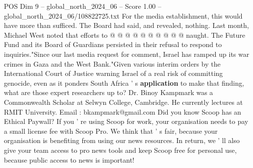 \begin{textsample}{POS Dim 9 – global\_north\_2024\_06 – Score 1.00 – global\_north\_2024\_06/108822725.txt}
For the media establishment, this would have more than sufficed.
The Board had said, and revealed, nothing.
Last month, Michael West noted that efforts to @ @ @ @ @ @ @ @ @ @ naught.
The Future Fund and its Board of Guardians persisted in their refusal to respond to inquiries."Since our last media request for comment, Israel has ramped up its war crimes in Gaza and the West Bank."Given various interim orders by the International Court of Justice warning Israel of a real risk of committing genocide, even as it ponders South Africa ' s \textbf{application} to make that finding, what are those expert researchers up to?
Dr.
Binoy Kampmark was a Commonwealth Scholar at Selwyn College, Cambridge.
He currently lectures at RMIT University.
Email : bkampmark@gmail.com Did you know Scoop has an Ethical Paywall?
If you ' re using Scoop for work, your organisation needs to pay a small license fee with Scoop Pro.
We think that ' s fair, because your organisation is benefiting from using our news resources.
In return, we ' ll also give your team access to pro news tools and keep Scoop free for personal use, because public access to news is important!

\end{textsample}
